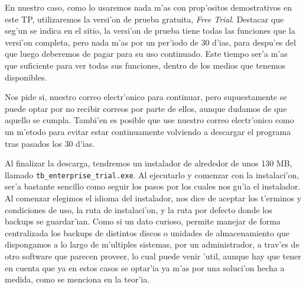 \documentclass[11pt]{article}
\begin{document}
		En nuestro caso, como lo usaremos nada m'as con prop'ositos demostrativos en este TP, utilizaremos la versi'on de prueba gratuita, \textit{Free Trial}. Destacar que seg'un se indica en el sitio, la versi'on de prueba tiene todas las funciones que la versi'on completa, pero nada m'as por un per'iodo de 30 d'ias, para despu'es del que luego deberemos de pagar para su uso continuado. Este tiempo ser'a m'as que suficiente para ver todas sus funciones, dentro de los medios que tenemos disponibles. 
		
		Nos pide si, nuestro correo electr'onico para continuar, pero supuestamente se puede optar por no recibir correos por parte de ellos, aunque dudamos de que aquello se cumpla. Tambi'en es posible que use nuestro correo electr'onico como un m'etodo para evitar estar continuamente volviendo a descargar el programa tras pasados los 30 d'ias.
		
		Al finalizar la descarga, tendremos un instalador de alrededor de unos 130 MB, llamado \texttt{tb\_enterprise\_trial.exe}. Al ejecutarlo y comenzar con la instalaci'on, ser'a bastante sencillo como seguir los pasos por los cuales nos gu'ia el instalador. Al comenzar elegimos el idioma del instalador, nos dice de aceptar los t'erminos y condiciones de uso, la ruta de instalaci'on, y la ruta por defecto donde los backups se guardar'ian. Como si un dato curioso, permite manejar de forma centralizada los backups de distintos discos o unidades de almacenamiento que dispongamos a lo largo de m'ultiples sistemas, por un administrador, a trav'es de otro software que parecen proveer,  lo cual puede venir 'util, aunque hay que tener en cuenta que ya en estos casos se optar'ia ya m'as por una soluci'on hecha a medida, como se menciona en la teor'ia.
\end{document}
